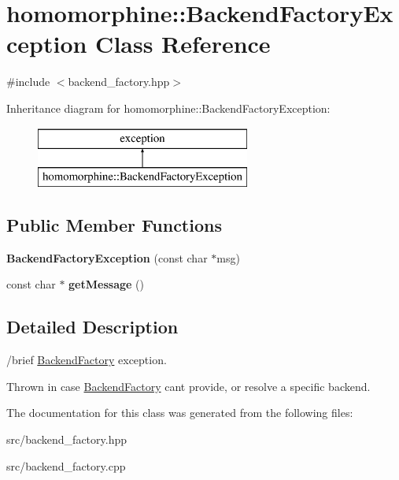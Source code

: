 \hypertarget{classhomomorphine_1_1_backend_factory_exception}{}\section{homomorphine\+::Backend\+Factory\+Exception Class Reference}
\label{classhomomorphine_1_1_backend_factory_exception}


{\ttfamily \#include $<$backend\+\_\+factory.\+hpp$>$}

Inheritance diagram for homomorphine\+::Backend\+Factory\+Exception\+:\begin{figure}[H]
\begin{center}
\leavevmode
\includegraphics[height=2.000000cm]{classhomomorphine_1_1_backend_factory_exception}
\end{center}
\end{figure}
\subsection*{Public Member Functions}
\begin{DoxyCompactItemize}
\item 
\mbox{\label{classhomomorphine_1_1_backend_factory_exception_a3a3558dd9e514b26d980d7a5d4ea5b94}} 
{\bfseries Backend\+Factory\+Exception} (const char $\ast$msg)
\item 
\mbox{\label{classhomomorphine_1_1_backend_factory_exception_a8bfd26d7c7a8275dd343c00029ad7cb3}} 
const char $\ast$ {\bfseries get\+Message} ()
\end{DoxyCompactItemize}


\subsection{Detailed Description}
/brief \mbox{\hyperlink{classhomomorphine_1_1_backend_factory}{Backend\+Factory}} exception.

Thrown in case \mbox{\hyperlink{classhomomorphine_1_1_backend_factory}{Backend\+Factory}} can\textquotesingle{}t provide, or resolve a specific backend. 

The documentation for this class was generated from the following files\+:\begin{DoxyCompactItemize}
\item 
src/backend\+\_\+factory.\+hpp\item 
src/backend\+\_\+factory.\+cpp\end{DoxyCompactItemize}
